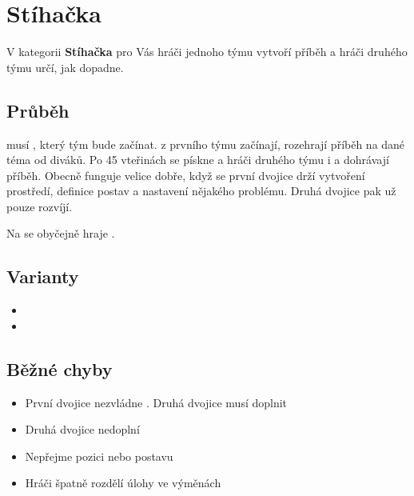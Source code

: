  
 
 
 
 
\needspace{5cm} \section{Stíhačka} \label{stíhačka}  
 
V kategorii \textbf{Stíhačka}{} pro Vás hráči jednoho týmu vytvoří příběh a hráči druhého týmu určí, jak dopadne. 
 
 
\subsection{Průběh}  musí , který tým bude začínat.  z prvního týmu začínají, rozehrají příběh na dané téma od diváků. Po 45 vteřinách se pískne a hráči druhého týmu  i  a dohrávají příběh. Obecně funguje velice dobře, když se první dvojice drží vytvoření prostředí, definice postav a nastavení nějakého problému. Druhá dvojice pak už pouze rozvíjí. 
 
Na  se obyčejně hraje . 
 
\subsection{ Varianty } \begin{itemize}
\item {}
\item {}
\end{itemize}
 
\subsection{ Běžné chyby } \begin{itemize}
\item První dvojice nezvládne . Druhá dvojice musí doplnit
\item Druhá dvojice nedoplní
\item Nepřejme pozici nebo postavu
\item Hráči špatně rozdělí úlohy ve výměnách
\end{itemize}
 
